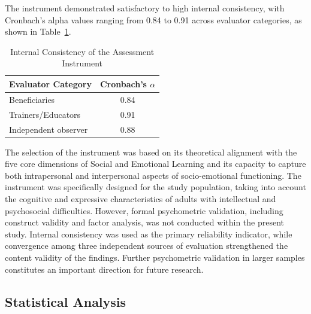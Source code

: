 \documentclass[journal]{IEEEtran}
\begin{document}
The instrument demonstrated satisfactory to high internal consistency, with Cronbach's alpha values ranging from 0.84 to 0.91 across evaluator categories, as shown in Table~\ref{tab:cronbach}.

\begin{table}[!t]
\caption{Internal Consistency of the Assessment Instrument}
\label{tab:cronbach}
\centering
\begin{tabular}{lc}
\hline
\textbf{Evaluator Category} & \textbf{Cronbach's $\alpha$} \\
\hline
Beneficiaries & 0.84 \\
Trainers/Educators & 0.91 \\
Independent observer & 0.88 \\
\hline
\end{tabular}
\end{table}

The selection of the instrument was based on its theoretical alignment with the five core dimensions of Social and Emotional Learning \cite{casel2020} and its capacity to capture both intrapersonal and interpersonal aspects of socio-emotional functioning. The instrument was specifically designed for the study population, taking into account the cognitive and expressive characteristics of adults with intellectual and psychosocial difficulties. However, formal psychometric validation, including construct validity and factor analysis, was not conducted within the present study. Internal consistency was used as the primary reliability indicator, while convergence among three independent sources of evaluation strengthened the content validity of the findings. Further psychometric validation in larger samples constitutes an important direction for future research.

\subsection{Statistical Analysis}
\end{document}
